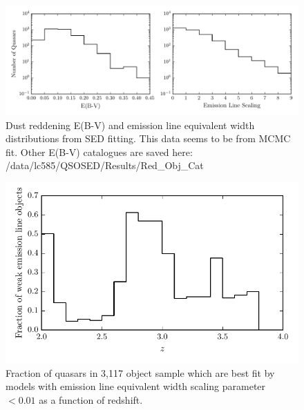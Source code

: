 \begin{figure}
  \centering
  \includegraphics[width=\textwidth]{figures/chapter06/ebv_and_elscal_hist.pdf}
  \caption{Dust reddening E(B-V) and emission line equivalent width distributions from SED fitting. This data seems to be from MCMC fit. Other E(B-V) catalogues are saved here: /data/lc585/QSOSED/Results/Red\_Obj\_Cat}
  \label{fig:ebvelscalhist}
\end{figure}

\begin{figure}
  \centering
  \includegraphics[width=\textwidth]{figures/chapter06/zhist_elscal.pdf}
  \caption{Fraction of quasars in 3,117 object sample which are best fit by models with emission line equivalent width scaling parameter $< 0.01$ as a function of redshift.}
  \label{fig:zhist_elscal}
\end{figure}

